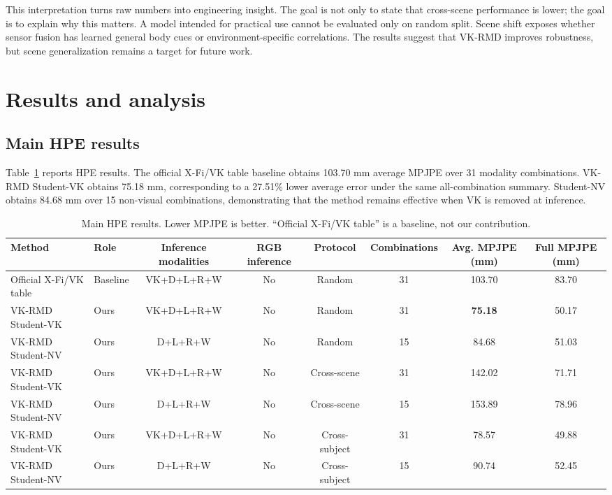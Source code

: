 \documentclass[preprint,12pt]{elsarticle}
\newcommand{\method}{VK-RMD}
\newcommand{\mpjpe}{MPJPE}
\begin{document}
This interpretation turns raw numbers into engineering insight. The goal is not only to state that cross-scene performance is lower; the goal is to explain why this matters. A model intended for practical use cannot be evaluated only on random split. Scene shift exposes whether sensor fusion has learned general body cues or environment-specific correlations. The results suggest that \method{} improves robustness, but scene generalization remains a target for future work.

\section{Results and analysis}

\subsection{Main HPE results}

Table~\ref{tab:hpe_main} reports HPE results. The official X-Fi/VK table baseline obtains 103.70 mm average \mpjpe{} over 31 modality combinations. \method{} Student-VK obtains 75.18 mm, corresponding to a 27.51\% lower average error under the same all-combination summary. Student-NV obtains 84.68 mm over 15 non-visual combinations, demonstrating that the method remains effective when VK is removed at inference.

\begin{table}[t]
\centering
\caption{Main HPE results. Lower \mpjpe{} is better. ``Official X-Fi/VK table'' is a baseline, not our contribution.}
\label{tab:hpe_main}
\begin{adjustbox}{width=\textwidth}
\begin{tabular}{llcccccc}
\toprule
Method & Role & Inference modalities & RGB inference & Protocol & Combinations & Avg. \mpjpe{} (mm) & Full \mpjpe{} (mm) \\
\midrule
Official X-Fi/VK table & Baseline & VK+D+L+R+W & No & Random & 31 & 103.70 & 83.70 \\
\method{} Student-VK & Ours & VK+D+L+R+W & No & Random & 31 & \textbf{75.18} & 50.17 \\
\method{} Student-NV & Ours & D+L+R+W & No & Random & 15 & 84.68 & 51.03 \\
\method{} Student-VK & Ours & VK+D+L+R+W & No & Cross-scene & 31 & 142.02 & 71.71 \\
\method{} Student-NV & Ours & D+L+R+W & No & Cross-scene & 15 & 153.89 & 78.96 \\
\method{} Student-VK & Ours & VK+D+L+R+W & No & Cross-subject & 31 & 78.57 & 49.88 \\
\method{} Student-NV & Ours & D+L+R+W & No & Cross-subject & 15 & 90.74 & 52.45 \\
\bottomrule
\end{tabular}
\end{adjustbox}
\end{table}
\end{document}
